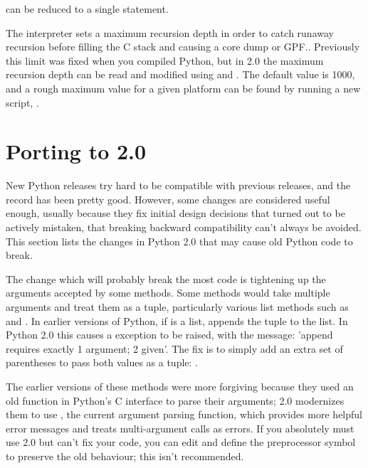 \documentclass{howto}
\begin{document}
can be reduced to a single  statement.

The interpreter sets a maximum recursion depth in order to catch
runaway recursion before filling the C stack and causing a core dump
or GPF..  Previously this limit was fixed when you compiled Python,
but in 2.0 the maximum recursion depth can be read and modified using
 and .
The default value is 1000, and a rough maximum value for a given
platform can be found by running a new script,
.

\section{Porting to 2.0}

New Python releases try hard to be compatible with previous releases,
and the record has been pretty good.  However, some changes are
considered useful enough, usually because they fix initial design decisions that
turned out to be actively mistaken, that breaking backward compatibility
can't always be avoided.  This section lists the changes in Python 2.0
that may cause old Python code to break.

The change which will probably break the most code is tightening up
the arguments accepted by some methods.  Some methods would take
multiple arguments and treat them as a tuple, particularly various
list methods such as  and .
In earlier versions of Python, if  is a list,  appends the tuple  to the list.  In Python 2.0 this
causes a  exception to be raised, with the
message: 'append requires exactly 1 argument; 2 given'.  The fix is to
simply add an extra set of parentheses to pass both values as a tuple: 
.

The earlier versions of these methods were more forgiving because they
used an old function in Python's C interface to parse their arguments;
2.0 modernizes them to use , the current
argument parsing function, which provides more helpful error messages
and treats multi-argument calls as errors.  If you absolutely must use
2.0 but can't fix your code, you can edit 
and define the preprocessor symbol  to
preserve the old behaviour; this isn't recommended.
\end{document}
